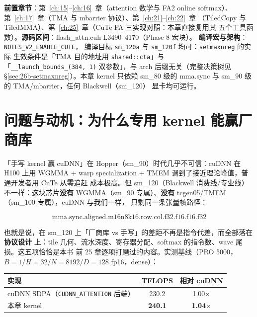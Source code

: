 \textbf{前置章节}：第~\ref{ch:15}--\ref{ch:16}~章（attention 数学与 FA2 online
softmax）、第~\ref{ch:17}~章（TMA 与 mbarrier 协议）、第~\ref{ch:21}--\ref{ch:22}~章
（TiledCopy 与 TiledMMA）、第~\ref{ch:25}~章（CuTe FA 三实现对照：本章直接复用其
五个工具函数）。\textbf{源码区间}：flash\_attn.cuh L3490--4170（Phase 8 宏块）。
\textbf{编译宏与架构}：\texttt{NOTES\_\allowbreak{}V2\_\allowbreak{}ENABLE\_\allowbreak{}CUTE}，
编译目标 \texttt{sm\_120a} 与 \texttt{sm\_120f} 均可：\texttt{setmaxnreg} 的实际
生效条件是「TMA 目的地址用 \texttt{shared::cta}」与「\texttt{\_\_launch\_\allowbreak{}bounds\_\allowbreak{}(384,~1)}
双参数」，与 arch 后缀无关（完整决策树见 \S\ref{sec:26b-setmaxnreg}）。本章 kernel
只依赖 sm\_80 级的 mma.sync 与 sm\_90 级的 TMA/mbarrier，任何 Blackwell（sm\_120）
显卡均可运行。

\section{问题与动机：为什么专用 kernel 能赢厂商库}\label{sec:26b-motivation}

「手写 kernel 赢 cuDNN」在 Hopper（sm\_90）时代几乎不可信：cuDNN 在 H100 上用
WGMMA + warp specialization + TMEM 调到了接近理论峰值，普通开发者用 CuTe 从零追赶
成本极高。但 sm\_120（Blackwell 消费线/专业线）不一样：这块芯片\textbf{没有}
WGMMA（sm\_90 专属）、\textbf{没有} tcgen05/TMEM（sm\_100 专属），cuDNN 与我们一样，
只剩同一条张量核路径：

\begin{equation*}
  \text{mma.sync.aligned.m16n8k16.row.col.f32.f16.f16.f32}
\end{equation*}

也就是说，在 sm\_120 上「厂商库 vs 手写」的差距不再是指令代差，而全部落在\textbf{协议设计}
上：tile 几何、流水深度、寄存器分配、softmax 的指令数、wave 尾损。这五项恰恰是本书
前 25 章逐项打磨过的内容。实测基线（PRO 5000，$B{=}1$/$H{=}32$/$N{=}8192$/$D{=}128$
fp16，dense）：

\begin{center}
\begin{tabular}{lcc}
\toprule
实现 & TFLOPS & 相对 cuDNN \\
\midrule
cuDNN SDPA（\texttt{CUDNN\_ATTENTION} 后端） & 230.2 & 1.00$\times$ \\
本章 kernel & \textbf{240.1} & \textbf{1.04$\times$} \\
\bottomrule
\end{tabular}
\end{center}

